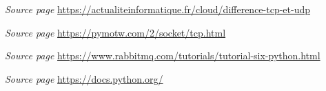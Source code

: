 \begin{thebibliography}{99999}
	\singlespace\normalsize
	
	
	 \textit{ Source page} \url{https://actualiteinformatique.fr/cloud/difference-tcp-et-udp}
	
	  \textit{ Source page}
	\url{https://pymotw.com/2/socket/tcp.html}
	
	  \textit{ Source page}
	\url{https://www.rabbitmq.com/tutorials/tutorial-six-python.html}
	
	  \textit{ Source page}
	\url{https://docs.python.org/}
	
\end{thebibliography}                   